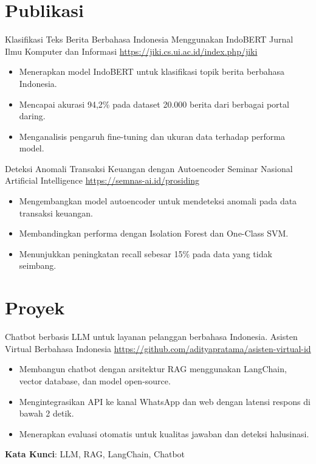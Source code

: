 \documentclass[a4paper, serif, 10pt]{moderncv}
\begin{document}
\section{Publikasi}

        {Klasifikasi Teks Berita Berbahasa Indonesia Menggunakan IndoBERT}
        {Jurnal Ilmu Komputer dan Informasi}
        {\url{https://jiki.cs.ui.ac.id/index.php/jiki}}
        {}
        {\begin{itemize}
\item Menerapkan model IndoBERT untuk klasifikasi topik berita berbahasa Indonesia.
\item Mencapai akurasi 94,2\% pada dataset 20.000 berita dari berbagai portal daring.
\item Menganalisis pengaruh fine-tuning dan ukuran data terhadap performa model.
\end{itemize}}

        {Deteksi Anomali Transaksi Keuangan dengan Autoencoder}
        {Seminar Nasional Artificial Intelligence}
        {\url{https://semnas-ai.id/prosiding}}
        {}
        {\begin{itemize}
\item Mengembangkan model autoencoder untuk mendeteksi anomali pada data transaksi keuangan.
\item Membandingkan performa dengan Isolation Forest dan One-Class SVM.
\item Menunjukkan peningkatan recall sebesar 15\% pada data yang tidak seimbang.
\end{itemize}}
\section{Proyek}

        {Chatbot berbasis LLM untuk layanan pelanggan berbahasa Indonesia.}
        {Asisten Virtual Berbahasa Indonesia}
        {\url{https://github.com/adityapratama/asisten-virtual-id}}
        {}
        {\begin{itemize}
\item Membangun chatbot dengan arsitektur RAG menggunakan LangChain, vector database, dan model open-source.
\item Mengintegrasikan API ke kanal WhatsApp dan web dengan latensi respons di bawah 2 detik.
\item Menerapkan evaluasi otomatis untuk kualitas jawaban dan deteksi halusinasi.
\end{itemize}
\textbf{Kata Kunci}: LLM, RAG, LangChain, Chatbot}
\end{document}
